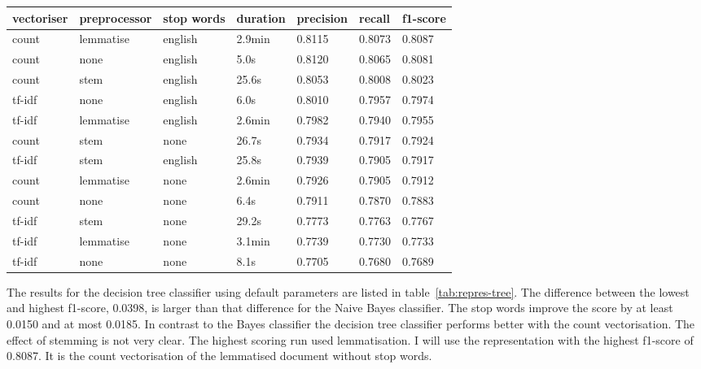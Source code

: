 \documentclass[11pt]{article}
\begin{document}
\begin{table*}[ht]\footnotesize
\centering
\begin{tabular}{ l l l l l l l }
vectoriser & preprocessor & stop words & duration & precision & recall & f1-score \\
\hline
count & lemmatise & english & 2.9min & 0.8115 & 0.8073 & 0.8087 \\
count & none & english & 5.0s & 0.8120 & 0.8065 & 0.8081 \\
count & stem & english & 25.6s & 0.8053 & 0.8008 & 0.8023 \\
tf-idf & none & english & 6.0s & 0.8010 & 0.7957 & 0.7974 \\
tf-idf & lemmatise & english & 2.6min &  0.7982 & 0.7940 & 0.7955 \\
count & stem & none & 26.7s & 0.7934 & 0.7917 & 0.7924 \\
tf-idf & stem & english & 25.8s & 0.7939 & 0.7905 & 0.7917 \\
count & lemmatise & none & 2.6min & 0.7926 & 0.7905 & 0.7912 \\
count & none & none & 6.4s & 0.7911 & 0.7870 & 0.7883 \\
tf-idf & stem & none & 29.2s & 0.7773 & 0.7763 & 0.7767 \\
tf-idf & lemmatise & none & 3.1min & 0.7739 & 0.7730 & 0.7733 \\
tf-idf & none & none & 8.1s & 0.7705 & 0.7680  & 0.7689 \\
\end{tabular}
\caption{scores for different representations and the decision tree classifier sorted by f1-score}
\label{tab:repres-tree}
\end{table*}

The results for the decision tree classifier using default parameters are listed in table~\ref{tab:repres-tree}. The difference between the lowest and highest f1-score, 0.0398, is larger than that difference for the Naive Bayes classifier. The stop words improve the score by at least 0.0150 and at most 0.0185. In contrast to the Bayes classifier the decision tree classifier performs better with the count vectorisation. The effect of stemming is not very clear. The highest scoring run used lemmatisation. I will use the representation with the highest f1-score of 0.8087. It is the count vectorisation of the lemmatised document without stop words.
\end{document}
